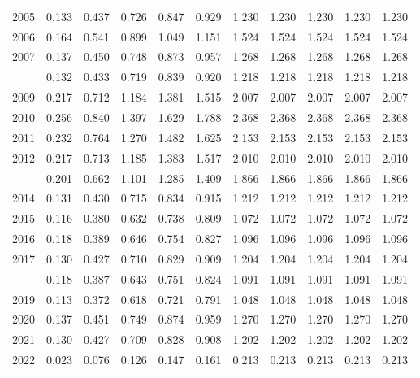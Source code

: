 \documentclass[
]{article}
\begin{document}
\begin{longtable}[t]{lrrrrrrrrrr}
2005 & 0.133 & 0.437 & 0.726 & 0.847 & 0.929 & 1.230 & 1.230 & 1.230 & 1.230 & 1.230\\
2006 & 0.164 & 0.541 & 0.899 & 1.049 & 1.151 & 1.524 & 1.524 & 1.524 & 1.524 & 1.524\\
2007 & 0.137 & 0.450 & 0.748 & 0.873 & 0.957 & 1.268 & 1.268 & 1.268 & 1.268 & 1.268\\
\addlinespace
2008 & 0.132 & 0.433 & 0.719 & 0.839 & 0.920 & 1.218 & 1.218 & 1.218 & 1.218 & 1.218\\
2009 & 0.217 & 0.712 & 1.184 & 1.381 & 1.515 & 2.007 & 2.007 & 2.007 & 2.007 & 2.007\\
2010 & 0.256 & 0.840 & 1.397 & 1.629 & 1.788 & 2.368 & 2.368 & 2.368 & 2.368 & 2.368\\
2011 & 0.232 & 0.764 & 1.270 & 1.482 & 1.625 & 2.153 & 2.153 & 2.153 & 2.153 & 2.153\\
2012 & 0.217 & 0.713 & 1.185 & 1.383 & 1.517 & 2.010 & 2.010 & 2.010 & 2.010 & 2.010\\
\addlinespace
2013 & 0.201 & 0.662 & 1.101 & 1.285 & 1.409 & 1.866 & 1.866 & 1.866 & 1.866 & 1.866\\
2014 & 0.131 & 0.430 & 0.715 & 0.834 & 0.915 & 1.212 & 1.212 & 1.212 & 1.212 & 1.212\\
2015 & 0.116 & 0.380 & 0.632 & 0.738 & 0.809 & 1.072 & 1.072 & 1.072 & 1.072 & 1.072\\
2016 & 0.118 & 0.389 & 0.646 & 0.754 & 0.827 & 1.096 & 1.096 & 1.096 & 1.096 & 1.096\\
2017 & 0.130 & 0.427 & 0.710 & 0.829 & 0.909 & 1.204 & 1.204 & 1.204 & 1.204 & 1.204\\
\addlinespace
2018 & 0.118 & 0.387 & 0.643 & 0.751 & 0.824 & 1.091 & 1.091 & 1.091 & 1.091 & 1.091\\
2019 & 0.113 & 0.372 & 0.618 & 0.721 & 0.791 & 1.048 & 1.048 & 1.048 & 1.048 & 1.048\\
2020 & 0.137 & 0.451 & 0.749 & 0.874 & 0.959 & 1.270 & 1.270 & 1.270 & 1.270 & 1.270\\
2021 & 0.130 & 0.427 & 0.709 & 0.828 & 0.908 & 1.202 & 1.202 & 1.202 & 1.202 & 1.202\\
2022 & 0.023 & 0.076 & 0.126 & 0.147 & 0.161 & 0.213 & 0.213 & 0.213 & 0.213 & 0.213\\*
\end{longtable}
\end{document}
